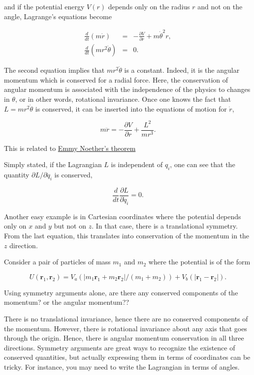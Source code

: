 \documentclass[%
oneside,                 %
final,                   %
10pt]{article}
\begin{document}
and if the potential energy $V(r)$ depends only on the radius $r$ and
not on the angle, Lagrange's equations become

\begin{eqnarray}
\frac{d}{dt}(m\dot{r})&=&-\frac{\partial V}{\partial r}+m\dot{\theta}^2r,\\
\nonumber
\frac{d}{dt}(mr^2\dot{\theta})&=&0.
\end{eqnarray}

The second equation implies that $mr^2\dot{\theta}$ is a
constant. Indeed, it is the angular momentum which is conserved for a
radial force. Here, the conservation of angular momentum is associated
with the independence of the physics to changes in $\theta$, or in
other words, rotational invariance. Once one knows the fact that
$L=mr^2\dot{\theta}$ is conserved, it can be inserted into the
equations of motion for $\dot{r}$,

\begin{equation}
m\ddot{r}=-\frac{\partial V}{\partial r}+\frac{L^2}{mr^3}.
\end{equation}

This is related to \href{{http://en.wikipedia.org/wiki/Noether's_theorem}}{Emmy Noether's theorem}

Simply stated, if the Lagrangian $L$ is independent of $q_i$, one can
see that the quantity $\partial L/\partial\dot{q}_i$ is conserved,

\begin{equation}
\frac{d}{dt}\frac{\partial L}{\partial\dot{q}_i}=0.
\end{equation}

Another easy example is in Cartesian coordinates where the potential
depends only on $x$ and $y$ but not on $z$. In that case, there is a
translational symmetry. From the last equation, this translates
into conservation of the momentum in the $z$ direction.

Consider a pair of particles of mass $m_1$ and $m_2$ where the potential is of the form

\[
U(\bm{r}_1,\bm{r}_2)=V_a(|m_1\bm{r}_1+m_2\bm{r}_2|/(m_1+m_2))+V_b(|\bm{r}_1-\bm{r}_2|).
\]

Using symmetry arguments alone, are there any conserved components of
the momentum? or the angular momentum??

There is no translational invariance, hence there are no conserved
components of the momentum. However, there is rotational invariance
about any axis that goes through the origin. Hence, there is angular
momentum conservation in all three directions. Symmetry arguments are
great ways to recognize the existence of conserved quantities, but
actually expressing them in terms of coordinates can be tricky. For
instance, you may need to write the Lagrangian in terms of angles.



\end{document}
